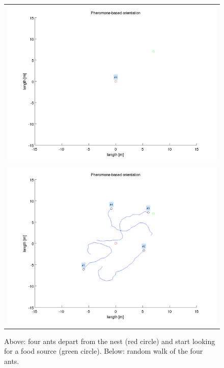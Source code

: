 \documentclass[11pt]{article}
\begin{document}
\begin{figure}
\centering
\begin{tabular}{c}
	\includegraphics[width=.9\textwidth]{../sources/results/pheromoneResults/snap_0001.png} \\
	\includegraphics[width=.9\textwidth]{../sources/results/pheromoneResults/snap_0036.png}
\end{tabular}
\caption{Above: four ants depart from the nest (red circle) and start looking for a food source (green circle). Below: random walk of the four ants.}
\end{figure}
\end{document}
